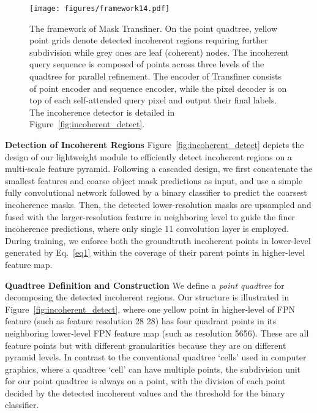 \documentclass[10pt,twocolumn,letterpaper]{article}
\newcommand{\parsection}[1]{\vspace{1mm}\noindent\textbf{#1}}
\begin{document}
\begin{figure*}[!t]
    \vspace{-0.2in}
	\centering
\texttt{[image: figures/framework14.pdf]}
\caption{The framework of Mask Transfiner. On the point quadtree, yellow point grids denote detected incoherent regions requiring further subdivision while grey ones are leaf (coherent) nodes. The incoherent query sequence is composed of points across three levels of the quadtree for parallel refinement. The encoder of Transfiner consists of point encoder and sequence encoder, while the pixel decoder is on top of each self-attended query pixel and output their final labels. The incoherence detector is detailed in Figure~\ref{fig:incoherent_detect}.}
    \label{fig:model}
    \vspace{-0.2in}
\end{figure*}

\parsection{Detection of Incoherent Regions}
Figure~\ref{fig:incoherent_detect} depicts the design of our lightweight module to efficiently detect incoherent regions on a multi-scale feature pyramid. Following a cascaded design, we first concatenate the smallest features and coarse object mask predictions as input, and use a simple fully convolutional network followed by a binary classifier to predict the coarsest incoherence masks. Then, the detected lower-resolution masks are upsampled and fused with the larger-resolution feature in neighboring level to guide the finer incoherence predictions, where only single 11 convolution layer is employed. During training, we enforce both the groundtruth incoherent points in lower-level generated by Eq.~\ref{eq1} within the coverage of their parent points in higher-level feature map. 


\parsection{Quadtree Definition and Construction} We define a \emph{point quadtree} for decomposing the detected incoherent regions. Our structure is illustrated in Figure~\ref{fig:incoherent_detect}, where one yellow point in higher-level of FPN feature (such as feature resolution 28 28) has four quadrant points in its neighboring lower-level FPN feature map (such as resolution 5656). These are all feature points but with different granularities because they are on different pyramid levels. In contrast to the conventional quadtree `cells' used in computer graphics, where a quadtree `cell' can have multiple points, the subdivision unit for our point quadtree is always on a point, with the division of each point decided by the detected incoherent values and the threshold for the binary classifier.
\end{document}
